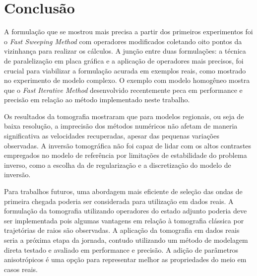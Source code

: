\chapter{Conclusão}
\label{ch:conclusao}

A formulação que se mostrou mais precisa a partir dos primeiros experimentos foi o \textit{Fast Sweeping Method} com operadores modificados coletando oito pontos da vizinhança para realizar os cálculos. A junção entre duas formulações: a técnica de paralelização em placa gráfica e a aplicação de operadores mais precisos, foi crucial para viabilizar a formulação acurada em exemplos reais, como mostrado no experimento de modelo complexo. O exemplo com modelo homogêneo mostra que o \textit{Fast Iterative Method} desenvolvido recentemente peca em performance e precisão em relação ao método implementado neste trabalho.  

Os resultados da tomografia mostraram que para modelos regionais, ou seja de baixa resolução, a imprecisão dos métodos numéricos não afetam de maneria significativa as velocidades recuperadas, apesar das pequenas variações observadas. A inversão tomográfica não foi capaz de lidar com os altos contrastes empregados no modelo de referência por limitações de estabilidade do problema inverso, como a escolha da de regularização e a discretização do modelo de inversão. 

Para trabalhos futuros, uma abordagem mais eficiente de seleção das ondas de primeira chegada poderia ser considerada para utilização em dados reais. A formulação da tomografia utilizando operadores do estado adjunto poderia deve ser implementada pois algumas vantagens em relação à tomografia clássica por trajetórias de raios são observadas. A aplicação da tomografia em dados reais seria a próxima etapa da jornada, contudo utilizando um método de modelagem direta testado e avaliado em performance e precisão. A adição de parâmetros anisotrópicos é uma opção para representar melhor as propriedades do meio em casos reais. 

